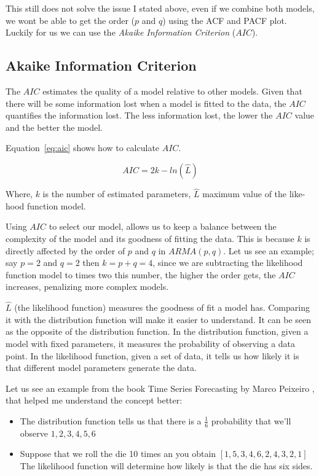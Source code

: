 \documentclass[journal]{IEEEtran}
\begin{document}
This still does not solve the issue I stated above, even if we combine both
models, we wont be able to get the order ($p$ and $q$) using the ACF and PACF
plot. Luckily for us we can use the \emph{Akaike Information Criterion}
($AIC$).

\subsection{Akaike Information Criterion}\label{sub:aic}

The $AIC$ estimates the quality of a model relative to other models.  Given
that there will be some information lost when a model is fitted to the data,
the $AIC$ quantifies the information lost. The less information lost, the
lower the $AIC$ value and the better the model.

Equation~\ref{eq:aic} shows how to calculate $AIC$.

\begin{equation}
    AIC = 2k - ln(\hat{L})
    \label{eq:aic}
\end{equation}

Where, $k$ is the number of estimated parameters, $\hat{L}$ maximum value of
the like-hood function model.

Using $AIC$ to select our model, allows us to keep a balance between the
complexity of the model and its goodness of fitting the data. This is because
$k$ is directly affected by the order of $p$ and $q$ in $ARMA(p,q)$. Let us
see an example; say $p = 2$ and $q=2$ then $k = p + q = 4$, since we are
subtracting the likelihood function model to times two this number, the
higher the order gets, the $AIC$ increases, penalizing more complex models.

$\hat{L}$ (the likelihood function) measures the goodness of fit a model has.
Comparing it with the distribution function will make it easier to understand.
It can be seen as the opposite of the distribution function. In the
distribution function, given a model with fixed parameters, it measures the
probability of observing a data point. In the likelihood function, given a
set of data, it tells us  how likely it is that different model parameters
generate the data.

Let us see an example from the book Time Series Forecasting by Marco Peixeiro
\cite{timeseries}, that helped me understand the concept better:

\begin{itemize}
    \item
        The distribution function tells us that there is a $\frac{1}{6}$
        probability that we'll observe ${1,2,3,4,5,6}$
    \item
        Suppose that we roll the die 10 times an you obtain
        $[1,5,3,4,6,2,4,3,2,1]$ The likelihood function will determine how
        likely is that the die has six sides.
\end{itemize}
\end{document}
